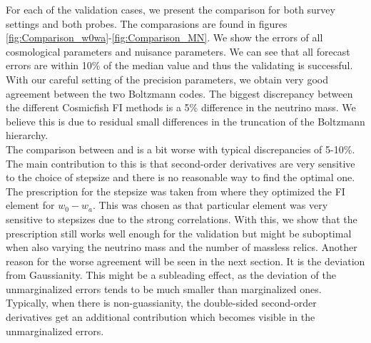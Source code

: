 \documentclass[../main.tex]{subfiles}
\begin{document}
For each of the validation cases, we present the comparison for both survey settings and both probes. The comparasions are found in figures \ref{fig:Comparison_w0wa}-\ref{fig:Comparison_MN}. We show the errors of all cosmological parameters and nuisance parameters. We can see that all forecast errors are within 10\% of the median value and thus the validating is successful. With our careful setting of the precision parameters, we obtain very good agreement between the two Boltzmann codes. The biggest discrepancy between the different Cosmicfish FI methods is a 5\% difference in the neutrino mass. We believe this is due to residual small differences in the truncation of the Boltzmann hierarchy.\\
The comparison between \montepython and \cosmicfish is a bit worse with typical discrepancies of 5-10\%. The main contribution to this is that second-order derivatives are very sensitive to the choice of stepsize and there is no reasonable way to find the optimal one. The prescription for the stepsize was taken from \cite{casas2023euclid} where they optimized the FI element for $w_0-w_a$. This was chosen as that particular element was very sensitive to stepsizes due to the strong correlations. With this, we show that the prescription still works well enough for the validation but might be suboptimal when also varying the neutrino mass and the number of massless relics. Another reason for the worse agreement will be seen in the next section. It is the deviation from Gaussianity. This might be a subleading effect, as the deviation of the unmarginalized errors tends to be much smaller than marginalized ones. Typically, when there is non-guassianity, the double-sided second-order derivatives get an additional contribution which becomes visible in the unmarginalized errors.
\end{document}
